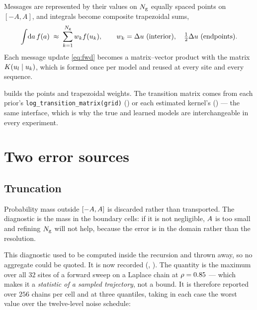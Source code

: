 Messages are represented by their values on $N_{\mathrm{g}}$ equally spaced points on $[-A,A]$, and
integrals become composite trapezoidal sums,
\begin{equation}
\int\!\mathrm{d}a\, f(a) \;\approx\; \sum_{k=1}^{\ngrid} w_k f(u_k),
\qquad
w_k = \Delta u \ \text{(interior)},\quad \tfrac{1}{2}\Delta u \ \text{(endpoints)} .
\end{equation}
Each message update \eqref{eq:fwd} becomes a matrix--vector product with the matrix
$K(u_l\mid u_k)$, which is formed once per model and reused at every site and every
sequence.

\begin{codebox}
 builds the points and trapezoidal weights.
The transition matrix comes from each prior's \texttt{log\_transition\_matrix(grid)}
() or each estimated kernel's () --- the same
interface, which is why the true and learned models are interchangeable in every experiment.
\end{codebox}

\section{Two error sources}

\subsection{Truncation}
\label{sec:truncation}

Probability mass outside $[-A,A]$ is discarded rather than transported. The
diagnostic is the mass in the boundary cells: if it is not negligible, $A$ is too small
and refining $N_{\mathrm{g}}$ will not help, because the error is in the domain rather than the
resolution.

This diagnostic used to be computed inside the recursion and thrown away, so no aggregate could
be quoted. It is now recorded (,
). The quantity is the maximum over all
$32$ sites of a forward sweep on a Laplace chain at $\rho=0.85$ --- which makes it a
\emph{statistic of a sampled trajectory}, not a bound. It is therefore reported over $256$ chains
per cell and at three quantiles, taking in each case the worst value over the twelve-level noise
schedule:

